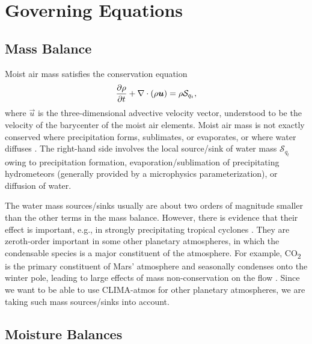 \documentclass{article}
\begin{document}
\section{Governing Equations}
\label{sec:governing_equations}

\subsection{Mass Balance}

Moist air mass satisfies the conservation equation
\begin{equation}
\frac{\partial \rho}{\partial t} + \nabla \cdot (\rho\boldsymbol{{u}}) = \rho \mathcal{S}_{q_t},
\label{eq:governing_equations/mass}
\end{equation}
where $\vec{u}$ is the three-dimensional advective velocity vector, understood to be the velocity of the barycenter of the moist air elements. Moist air mass is not exactly conserved where precipitation forms, sublimates, or evaporates, or where water diffuses \citep{Bott08a}. The  right-hand side involves the local source/sink of water mass $\mathcal{S}_{q_t}$ owing to precipitation formation, evaporation/sublimation of precipitating hydrometeors (generally provided by a microphysics parameterization), or diffusion of water. 

The water mass sources/sinks usually are about two orders of magnitude smaller than the other terms in the mass balance. However, there is evidence that their effect is important, e.g., in strongly precipitating tropical cyclones \citep{Qiu93a,Lackmann04a}. They are zeroth-order important in some other planetary atmospheres, in which the condensable species is a major constituent of the atmosphere. For example, CO\textsubscript{2} is the primary constituent of Mars' atmosphere and seasonally condenses onto the winter pole, leading to large effects of mass non-conservation on the flow \cite[e.g.,][]{Soto15a}. Since we want to be able to use CLIMA-atmos for other planetary atmospheres, we are taking such mass sources/sinks into account.

\subsection{Moisture Balances}
\end{document}
